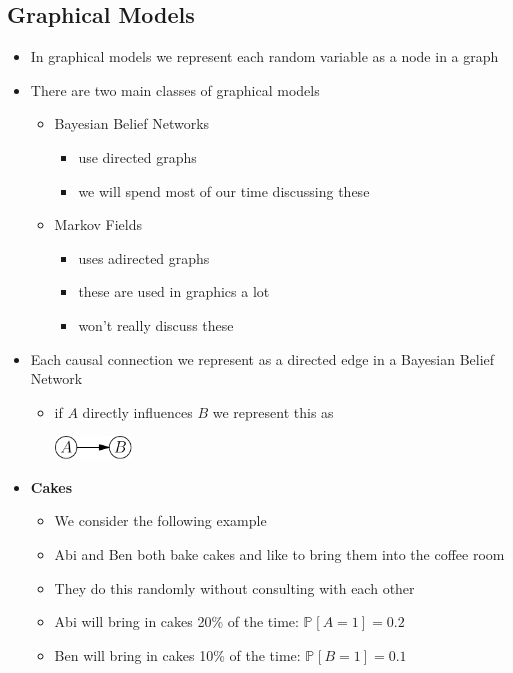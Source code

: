 \documentclass[11pt]{article}
\newcommand{\Prob}[2][]{\mathbb{P}_{#1\!}\left[ #2 \right]}
\begin{document}
\subsection{Graphical Models}
\label{sec:org2524c1a}
\begin{itemize}
\item In graphical models we represent each random variable as a node
in a graph
\item There are two main classes of graphical models
\begin{itemize}
\item Bayesian Belief Networks
\begin{itemize}
\item use directed graphs
\item we will spend most of our time discussing these
\end{itemize}
\item Markov Fields
\begin{itemize}
\item uses adirected graphs
\item these are used in graphics a lot
\item won't really discuss these
\end{itemize}
\end{itemize}
\item Each causal connection we represent as a directed edge in a
Bayesian Belief Network
\begin{itemize}
\item if \(A\) directly influences \(B\) we represent this as
\begin{center}
\includegraphics[width=0.17\textwidth]{figures/atob.pdf}
\end{center}
\end{itemize}
\item \textbf{Cakes}
\begin{itemize}
\item We consider the following example
\item Abi and Ben both bake cakes and like to bring them into the
coffee room
\item They do this randomly without consulting with each other
\item Abi will bring in cakes 20\% of the time: \(\Prob{A=1} = 0.2\)
\item Ben will bring in cakes 10\% of the time: \(\Prob{B=1} = 0.1\)

\end{itemize}
\end{itemize}
\end{document}
